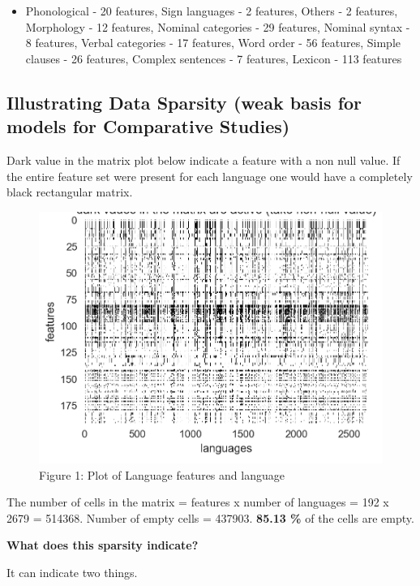 \begin{itemize}
\item Phonological - 20 features, Sign languages - 2 features, Others - 2 features, Morphology - 12 features, Nominal categories - 29 features, Nominal syntax - 8 features, Verbal categories - 17 features, Word order - 56 features, Simple clauses - 26 features, Complex sentences - 7 features, Lexicon - 113 features

\end{itemize}


\subsection{Illustrating Data Sparsity (weak basis for models for Comparative Studies)}

Dark value in the matrix plot below indicate a feature with a non null value. If the entire feature set were present for each language one would have a completely black rectangular matrix.

\begin{figure}[!hbp]
\includegraphics[scale=0.29]{"images/6_02.jpg"}
\caption{Figure 1: Plot of Language features and language}\label{art6-fig02}
\end{figure}

The number of cells in the matrix = features x number of languages = 192 x 2679 = 514368. Number of empty cells = 437903. \textbf{85.13 \%} of the cells are empty.

\textbf{What does this sparsity indicate?}

It can indicate two things.


